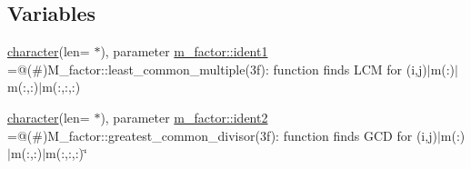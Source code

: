 \subsection*{Variables}
\begin{DoxyCompactItemize}
\item 
\hyperlink{option__stopwatch_83_8txt_abd4b21fbbd175834027b5224bfe97e66}{character}(len= $\ast$), parameter \hyperlink{namespacem__factor_a7ae228777d43741d83e3a4df917f39df}{m\+\_\+factor\+::ident1} =\textquotesingle{}@(\#)M\+\_\+factor\+::least\+\_\+common\+\_\+multiple(3f)\+: function finds L\+C\+M for (i,j)$\vert$m(\+:)$\vert$m(\+:,\+:)$\vert$m(\+:,\+:,\+:)\textquotesingle{}
\item 
\hyperlink{option__stopwatch_83_8txt_abd4b21fbbd175834027b5224bfe97e66}{character}(len= $\ast$), parameter \hyperlink{namespacem__factor_ab34da44c20883bea1b31a67a3d6359e5}{m\+\_\+factor\+::ident2} =\textquotesingle{}@(\#)M\+\_\+factor\+::greatest\+\_\+common\+\_\+divisor(3f)\+: function finds G\+C\+D for (i,j)$\vert$m(\+:)$\vert$m(\+:,\+:)$\vert$m(\+:,\+:,\+:)\char`\"{}\textquotesingle{}
\end{DoxyCompactItemize}
